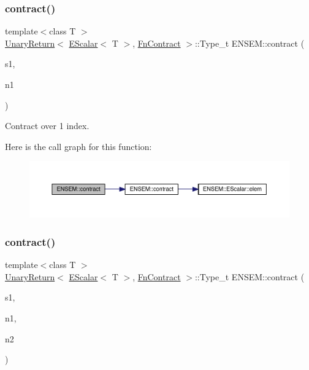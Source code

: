 \subsubsection{\texorpdfstring{contract()}{contract()}\hspace{0.1cm}{\footnotesize\ttfamily [1/4]}}
{\footnotesize\ttfamily template$<$class T $>$ \\
\mbox{\hyperlink{structENSEM_1_1UnaryReturn}{Unary\+Return}}$<$ \mbox{\hyperlink{classENSEM_1_1EScalar}{E\+Scalar}}$<$ T $>$, \mbox{\hyperlink{structENSEM_1_1FnContract}{Fn\+Contract}} $>$\+::Type\+\_\+t E\+N\+S\+E\+M\+::contract (\begin{DoxyParamCaption}\item[{const \mbox{\hyperlink{classENSEM_1_1EScalar}{E\+Scalar}}$<$ T $>$ \&}]{s1,  }\item[{int}]{n1 }\end{DoxyParamCaption})\hspace{0.3cm}{\ttfamily [inline]}}



Contract over 1 index. 

Here is the call graph for this function\+:\nopagebreak
\begin{figure}[H]
\begin{center}
\leavevmode
\includegraphics[width=350pt]{d2/d94/namespaceENSEM_a8a53ef224c8fabaae4e9319588554b96_cgraph}
\end{center}
\end{figure}
\mbox{\label{namespaceENSEM_a370746f882b263d5a3925d4fae5c899b}} 
\subsubsection{\texorpdfstring{contract()}{contract()}\hspace{0.1cm}{\footnotesize\ttfamily [2/4]}}
{\footnotesize\ttfamily template$<$class T $>$ \\
\mbox{\hyperlink{structENSEM_1_1UnaryReturn}{Unary\+Return}}$<$ \mbox{\hyperlink{classENSEM_1_1EScalar}{E\+Scalar}}$<$ T $>$, \mbox{\hyperlink{structENSEM_1_1FnContract}{Fn\+Contract}} $>$\+::Type\+\_\+t E\+N\+S\+E\+M\+::contract (\begin{DoxyParamCaption}\item[{const \mbox{\hyperlink{classENSEM_1_1EScalar}{E\+Scalar}}$<$ T $>$ \&}]{s1,  }\item[{int}]{n1,  }\item[{int}]{n2 }\end{DoxyParamCaption})\hspace{0.3cm}{\ttfamily [inline]}}



